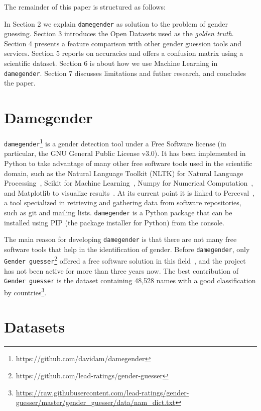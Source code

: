 \documentclass[a4paper]{article}
\begin{document}
The remainder of this paper is structured as follows:

In Section 2 we explain \texttt{damegender} as solution to the
problem of gender guessing. Section 3 introduces the Open Datasets used as the \emph{golden truth}.
Section 4 presents a feature comparison with other gender guession tools and services.
Section 5 reports on accuracies and offers a confusion matrix using a scientific dataset.
Section 6 is about how we use Machine Learning in \texttt{damegender}.
Section 7 discusses limitations and futher research, and concludes the paper.

\section{Damegender}

\texttt{damegender}\footnote{https://github.com/davidam/damegender} is a gender detection tool under a Free Software license (in particular, the GNU General Public License v3.0). 
It has been implemented in Python to take advantage of many other free software tools used in the scientific domain, such as the Natural Language Toolkit (NLTK) for Natural Language Processing~\cite{loper2002nltk}, Scikit for Machine Learning~\cite{pedregosa2011scikit}, Numpy for Numerical Computation~\cite{van2011numpy}, and Matplotlib to visualize results~\cite{hunter2007matplotlib}. 
At its current point it is linked to Perceval~\cite{duenas2018perceval}, a tool specialized in retrieving and gathering data from software repositories, such as git and mailing lists.
\texttt{damegender} is a Python package that can be installed using PIP (the package installer for Python) from the console.


The main reason for developing \texttt{damegender} is that there are not many free software tools that help in the identification of gender. Before \texttt{damegender}, only \texttt{Gender guesser}\footnote{https://github.com/lead-ratings/gender-guesser} offered a free software solution in this field~\cite{krawetz2006gender}, and the project has not been active for more than three years now.
The best contribution of \texttt{Gender guesser} is the dataset containing 48,528 names with a good classification by countries\footnote{\url{https://raw.githubusercontent.com/lead-ratings/gender-guesser/master/gender_guesser/data/nam_dict.txt}}.

\section{Datasets}
\end{document}
